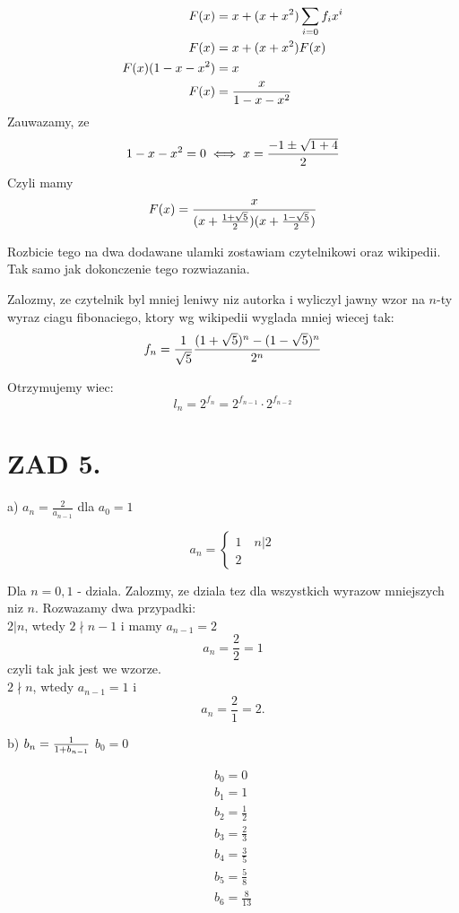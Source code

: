 \documentclass{article}[13pt]
\begin{document}
    \begin{align*}
        F(x)&=x+(x+x^2)\sum\limits_{i=0}f_ix^i\\
        F(x)&=x+(x+x^2)F(x)\\
        F(x)(1-x-x^2)&=x\\
        F(x)&={x\over 1-x-x^2}
    \end{align*}
    Zauwazamy, ze 
    $$1-x-x^2=0\iff x={-1\pm\sqrt{1+4}\over 2}$$
    Czyli mamy
    $$F(x)={x\over (x+{1+\sqrt5\over 2})(x+{1-\sqrt5\over 2})}$$

    Rozbicie tego na dwa dodawane ulamki zostawiam czytelnikowi oraz wikipedii. Tak samo jak dokonczenie tego rozwiazania.
    \medskip

    Zalozmy, ze czytelnik byl mniej leniwy niz autorka i wyliczyl jawny wzor na $n$-ty wyraz ciagu fibonaciego, ktory wg wikipedii wyglada mniej wiecej tak:
    $$f_n=\frac1{\sqrt5}{(1+\sqrt5)^n-(1-\sqrt5)^n\over 2^n}$$

    Otrzymujemy wiec:
    $$l_n=2^{f_n}=2^{f_{n-1}}\cdot 2^{f_{n-2}}$$


    \section*{ZAD 5.}

    a) $a_n=\frac 2{a_{n-1}}$ dla $a_0=1$

    $$a_n=\begin{cases}
        1\quad n|2\\
        2
    \end{cases}$$

    Dla $n=0, 1$ - dziala. Zalozmy, ze dziala tez dla wszystkich wyrazow mniejszych niz $n$. Rozwazamy dwa przypadki:\smallskip\\
    \indent $2|n$, wtedy $2\nmid n-1$ i mamy $a_{n-1}=2$
    $$a_n=\frac22=1$$
    czyli tak jak jest we wzorze.\smallskip\\
    \indent $2\nmid n$, wtedy $a_{n-1}=1$ i
    $$a_n=\frac21=2.$$

    \medskip

    b) $b_n={1\over 1+b_{n-1}}$ $b_0=0$

    \begin{align*}
        b_0=0\\
        b_1=1\\
        b_2=\frac12\\
        b_3=\frac23\\
        b_4=\frac35\\
        b_5=\frac58\\
        b_6=\frac8{13}
    \end{align*}
\end{document}
